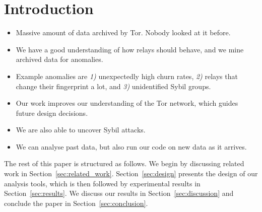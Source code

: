 \section{Introduction}
\label{sec:introduction}

\begin{itemize}
	\item Massive amount of data archived by Tor.  Nobody looked at it before.

	\item We have a good understanding of how relays should behave, and we mine
		archived data for anomalies.

	\item Example anomalies are \emph{1)} unexpectedly high churn rates,
		\emph{2)} relays that change their fingerprint a lot, and \emph{3)}
		unidentified Sybil groups.

	\item Our work improves our understanding of the Tor network, which guides
		future design decisions.

	\item We are also able to uncover Sybil attacks.

	\item We can analyse past data, but also run our code on new data as it
		arrives.
\end{itemize}

The rest of this paper is structured as follows.  We begin by discussing
related work in Section~\ref{sec:related_work}.  Section~\ref{sec:design}
presents the design of our analysis tools, which is then followed by
experimental results in Section~\ref{sec:results}.  We discuss our results in
Section~\ref{sec:discussion} and conclude the paper in
Section~\ref{sec:conclusion}.
